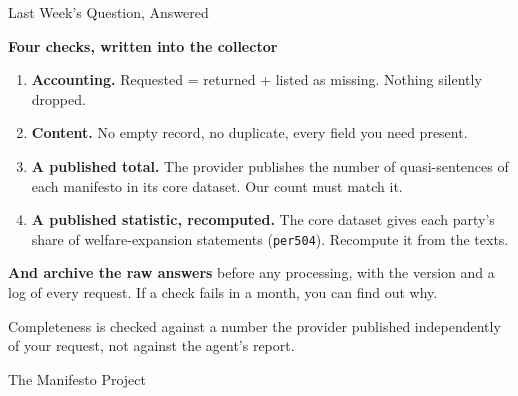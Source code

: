 \begin{frame}{Last Week's Question, Answered}

\small
\textbf{Four checks, written into the collector}

\vspace{0.1cm}
\begin{enumerate}
    \setlength{\itemsep}{5pt}
    \item \textbf{Accounting.} Requested = returned + listed as missing. Nothing silently dropped.
    \item \textbf{Content.} No empty record, no duplicate, every field you need present.
    \item \textbf{A published total.} The provider publishes the number of quasi-sentences of each manifesto in its core dataset. Our count must match it.
    \item \textbf{A published statistic, recomputed.} The core dataset gives each party's share of welfare-expansion statements (\texttt{per504}). Recompute it from the texts.
\end{enumerate}

\vspace{0.2cm}

\textbf{And archive the raw answers} before any processing, with the version and a log of every request. If a check fails in a month, you can find out why.

\vspace{0.2cm}

\centering
\alert{Completeness is checked against a number the provider published independently of your request, not against the agent's report.}

\end{frame}

\begin{frame}{The Manifesto Project}

\small

\end{frame}

